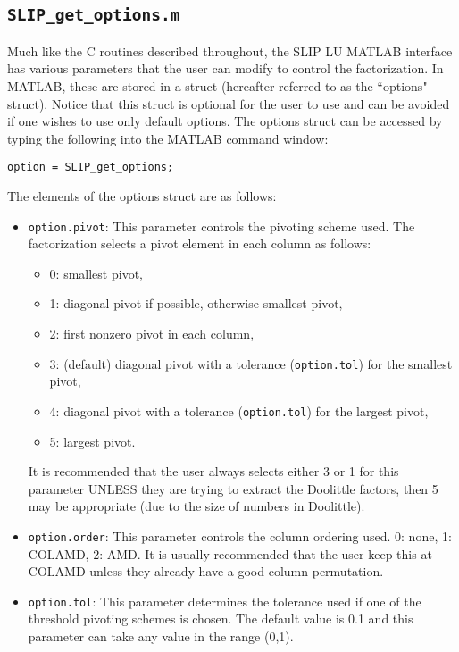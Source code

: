\documentclass[12pt]{article}
\theoremstyle{definition}
\begin{document}
\cprotect\subsection{\verb|SLIP_get_options.m|}
\label{s:Use:MATLAB:setup}

Much like the C routines described throughout, the SLIP LU MATLAB interface has
various parameters that the user can modify to control the factorization. In
MATLAB, these are stored in a struct (hereafter referred to as the ``options"
struct). Notice that this struct is optional for the
user to use and can be avoided if one wishes to use only default options. The
options struct can be accessed by typing the following into the MATLAB command
window:

\verb|option = SLIP_get_options;|

The elements of the options struct are as follows:

\begin{itemize}

\item \verb|option.pivot|: This parameter controls the pivoting scheme used.
The factorization selects a pivot element in each column as follows:

    \begin{itemize}
    \item 0: smallest pivot,
    \item 1: diagonal pivot if possible, otherwise smallest pivot,
    \item 2: first nonzero pivot in each column,
    \item 3: (default) diagonal pivot with a tolerance (\verb|option.tol|)
        for the smallest pivot,
    \item 4: diagonal pivot with a tolerance (\verb|option.tol|)
        for the largest pivot,
    \item 5: largest pivot.
    \end{itemize}

It is recommended that the user always selects either 3 or 1 for this parameter
UNLESS they are trying to extract the Doolittle factors, then 5 may be
appropriate (due to the size of numbers in Doolittle).

\item \verb|option.order|: This parameter controls the column ordering used.
0: none, 1: COLAMD, 2: AMD. It is usually recommended that the user keep this
at COLAMD unless they already have a good column permutation.

\item \verb|option.tol|: This parameter determines the tolerance used if one of
the threshold pivoting schemes is chosen. The default value is 0.1 and this
parameter can take any value in the range (0,1).

\end{itemize}
\end{document}

